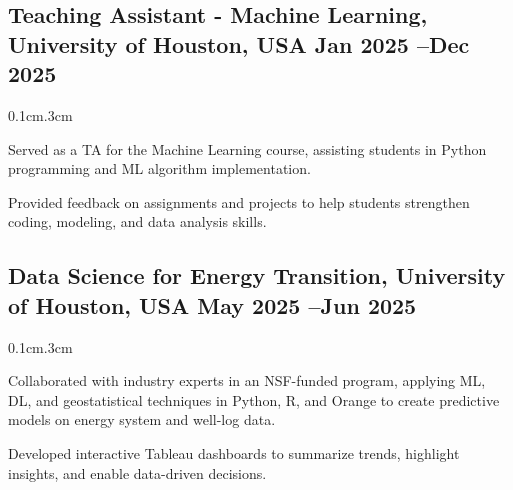 \subsection{{Teaching Assistant - Machine Learning, University of Houston, USA \hfill Jan 2025 --Dec 2025}}
\begin{adjustwidth}{0.1cm}{.3cm}

\begin{zitemize}

   

\item  Served as a TA for the Machine Learning course, assisting students in Python programming and ML algorithm implementation.

\item  Provided feedback on assignments and projects to help students strengthen coding, modeling, and data analysis skills.

\end{zitemize}
\end{adjustwidth}


\vspace{.70em}


\subsection{{Data Science for Energy Transition, University of Houston, USA \hfill May 2025 --Jun 2025}}
\begin{adjustwidth}{0.1cm}{.3cm}

\begin{zitemize}

\item Collaborated with industry experts in an NSF-funded program, applying ML, DL, and geostatistical techniques in Python, R, and Orange to create predictive models on energy system and well-log data.
\item  Developed interactive Tableau dashboards to summarize trends, highlight insights, and enable data-driven decisions.



\end{zitemize}
\end{adjustwidth}
\vspace{.70em}



